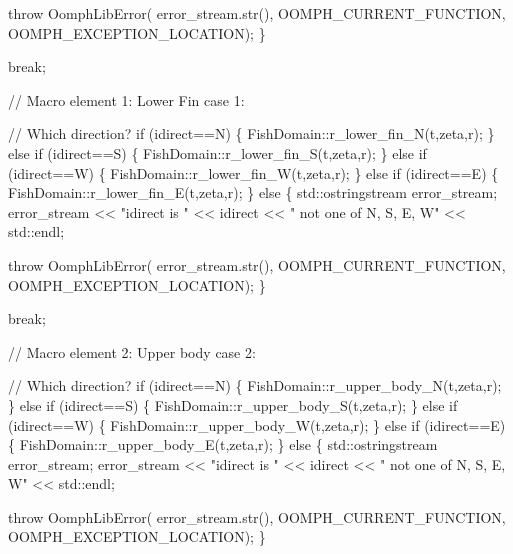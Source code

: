 \begin{DoxyCodeInclude}
     \textcolor{keywordflow}{throw} OomphLibError(
      error\_stream.str(),
      OOMPH\_CURRENT\_FUNCTION,
      OOMPH\_EXCEPTION\_LOCATION);
    \}
   
   \textcolor{keywordflow}{break};

   \textcolor{comment}{// Macro element 1: Lower Fin}
  \textcolor{keywordflow}{case} 1:
   
   \textcolor{comment}{// Which direction?}
   \textcolor{keywordflow}{if} (idirect==N)
    \{
     FishDomain::r\_lower\_fin\_N(t,zeta,r);
    \}
   \textcolor{keywordflow}{else} \textcolor{keywordflow}{if} (idirect==S)
    \{
     FishDomain::r\_lower\_fin\_S(t,zeta,r);
    \}
   \textcolor{keywordflow}{else} \textcolor{keywordflow}{if} (idirect==W)
    \{
     FishDomain::r\_lower\_fin\_W(t,zeta,r);
    \}
   \textcolor{keywordflow}{else} \textcolor{keywordflow}{if} (idirect==E)
    \{
     FishDomain::r\_lower\_fin\_E(t,zeta,r);
    \}
   \textcolor{keywordflow}{else}
    \{
     std::ostringstream error\_stream;
     error\_stream << \textcolor{stringliteral}{"idirect is "} << idirect 
                  << \textcolor{stringliteral}{" not one of N, S, E, W"} <<  std::endl;

     \textcolor{keywordflow}{throw} OomphLibError(
      error\_stream.str(),
      OOMPH\_CURRENT\_FUNCTION,
      OOMPH\_EXCEPTION\_LOCATION);
    \}
   
   \textcolor{keywordflow}{break};   
   

   \textcolor{comment}{// Macro element 2: Upper body}
  \textcolor{keywordflow}{case} 2:
   
   \textcolor{comment}{// Which direction?}
   \textcolor{keywordflow}{if} (idirect==N)
    \{
     FishDomain::r\_upper\_body\_N(t,zeta,r);
    \}
   \textcolor{keywordflow}{else} \textcolor{keywordflow}{if} (idirect==S)
    \{
     FishDomain::r\_upper\_body\_S(t,zeta,r);
    \}
   \textcolor{keywordflow}{else} \textcolor{keywordflow}{if} (idirect==W)
    \{
     FishDomain::r\_upper\_body\_W(t,zeta,r);
    \}
   \textcolor{keywordflow}{else} \textcolor{keywordflow}{if} (idirect==E)
    \{
     FishDomain::r\_upper\_body\_E(t,zeta,r);
    \}
   \textcolor{keywordflow}{else}
    \{
     std::ostringstream error\_stream;
     error\_stream << \textcolor{stringliteral}{"idirect is "} << idirect 
                  << \textcolor{stringliteral}{" not one of N, S, E, W"} <<  std::endl;

     \textcolor{keywordflow}{throw} OomphLibError(
      error\_stream.str(),
      OOMPH\_CURRENT\_FUNCTION,
      OOMPH\_EXCEPTION\_LOCATION);
    \}
   

\end{DoxyCodeInclude}
